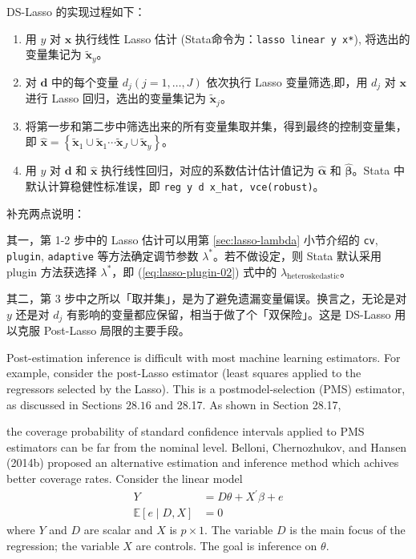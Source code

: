 \vspace{5pt}
DS-Lasso 的实现过程如下：
\begin{enumerate}
\item 用 $y$ 对 $\mathbf{x}$ 执行线性 Lasso 估计 (Stata命令为：\texttt{lasso linear y x*}), 将选出的变量集记为 $\widetilde{\mathbf{x}}_{y}$。
\item 对 $\mathbf{d}$ 中的每个变量 $d_{j} (j=1, \ldots, J)$ 依次执行 Lasso 变量筛选,即，用 $d_{j}$ 对 $\mathbf{x}$ 进行 Lasso 回归，选出的变量集记为 $\widetilde{\mathbf{x}}_{j}$。
\item 将第一步和第二步中筛选出来的所有变量集取并集，得到最终的控制变量集，即  $\widehat{\mathbf{x}} = \left\{\widetilde{\mathbf{x}}_{1} \cup \widetilde{\mathbf{x}}_{1} \cdots \widetilde{\mathbf{x}}_{J} \cup \widetilde{\mathbf{x}}_{y}\right\}$。
\item 用 $y$ 对 $\mathbf{d}$ 和 $\widehat{\mathbf{x}}$ 执行线性回归，对应的系数估计估计值记为 $\widehat{\boldsymbol{\alpha}}$ 和 $\widehat{\boldsymbol{\beta}}$。Stata 中默认计算稳健性标准误，即 \texttt{reg y d x\_hat, vce(robust)}。
\end{enumerate}
补充两点说明：

其一，第 1-2 步中的 Lasso 估计可以用第 \ref{sec:lasso-lambda} 小节介绍的 \texttt{cv}, \texttt{plugin}, \texttt{adaptive} 等方法确定调节参数 $\lambda^*$。若不做设定，则 Stata 默认采用 plugin 方法获选择 $\lambda^*$，即 (\ref{eq:lasso-plugin-02}) 式中的 $\lambda_{\text {heteroskedastic}}$。

其二，第 3 步中之所以「取并集」，是为了避免遗漏变量偏误。换言之，无论是对 $y$ 还是对 $d_j$ 有影响的变量都应保留，相当于做了个「双保险」。这是 DS-Lasso 用以克服 Post-Lasso 局限的主要手段。
 

\iffalse %
Post-estimation inference is difficult with most machine learning estimators. For example, consider the post-Lasso estimator (least squares applied to the regressors selected by the Lasso). This is a postmodel-selection (PMS) estimator, as discussed in Sections $28.16$ and 28.17. As shown in Section 28.17,

the coverage probability of standard confidence intervals applied to PMS estimators can be far from the nominal level. Belloni, Chernozhukov, and Hansen (2014b) proposed an alternative estimation and inference method which achives better coverage rates.
Consider the linear model
\begin{equation}\label{eq:lasso-DS-01A}
\begin{aligned}%
Y &=D \theta+X^{\prime} \beta+e \\
\mathbb{E}[e \mid D, X] &=0
\end{aligned}
\end{equation}
where $Y$ and $D$ are scalar and $X$ is $p \times 1$. The variable $D$ is the main focus of the regression; the variable $X$ are controls. The goal is inference on $\theta$.

